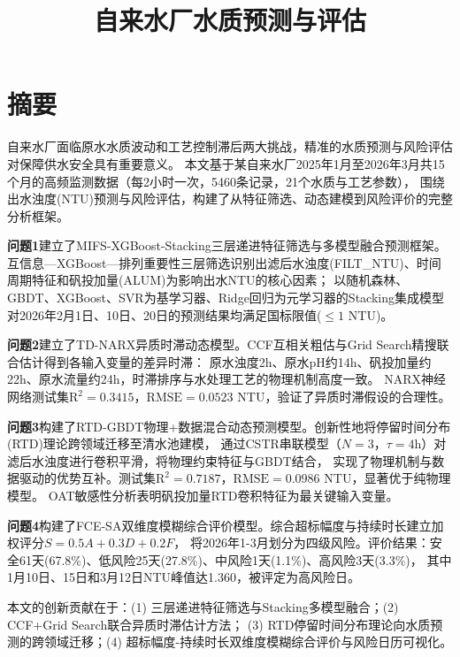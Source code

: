 \documentclass[12pt,a4paper]{ctexart}
\title{\vspace{-2cm}\textbf{自来水厂水质预测与评估}}
\author{}
\date{}
\begin{document}
\maketitle
\thispagestyle{empty}

\section*{摘\quad 要}
\thispagestyle{fancy}

自来水厂面临原水水质波动和工艺控制滞后两大挑战，精准的水质预测与风险评估对保障供水安全具有重要意义。
本文基于某自来水厂2025年1月至2026年3月共15个月的高频监测数据（每2小时一次，5460条记录，21个水质与工艺参数），
围绕出水浊度(NTU)预测与风险评估，构建了从特征筛选、动态建模到风险评价的完整分析框架。

\textbf{问题1}建立了MIFS-XGBoost-Stacking三层递进特征筛选与多模型融合预测框架。
互信息—XGBoost—排列重要性三层筛选识别出滤后水浊度(FILT\_NTU)、时间周期特征和矾投加量(ALUM)为影响出水NTU的核心因素；
以随机森林、GBDT、XGBoost、SVR为基学习器、Ridge回归为元学习器的Stacking集成模型对2026年2月1日、10日、20日的预测结果均满足国标限值($\leq 1$ NTU)。

\textbf{问题2}建立了TD-NARX异质时滞动态模型。CCF互相关粗估与Grid Search精搜联合估计得到各输入变量的差异时滞：
原水浊度2h、原水pH约14h、矾投加量约22h、原水流量约24h，时滞排序与水处理工艺的物理机制高度一致。
NARX神经网络测试集$\mathrm{R}^2=0.3415$，$\mathrm{RMSE}=0.0523$ NTU，验证了异质时滞假设的合理性。

\textbf{问题3}构建了RTD-GBDT物理+数据混合动态预测模型。创新性地将停留时间分布(RTD)理论跨领域迁移至清水池建模，
通过CSTR串联模型（$N=3$，$\tau=4$h）对滤后水浊度进行卷积平滑，将物理约束特征与GBDT结合，
实现了物理机制与数据驱动的优势互补。测试集$\mathrm{R}^2=0.7187$，$\mathrm{RMSE}=0.0986$ NTU，显著优于纯物理模型。
OAT敏感性分析表明矾投加量RTD卷积特征为最关键输入变量。

\textbf{问题4}构建了FCE-SA双维度模糊综合评价模型。综合超标幅度与持续时长建立加权评分$S=0.5A+0.3D+0.2F$，
将2026年1-3月划分为四级风险。评价结果：安全61天(67.8\%)、低风险25天(27.8\%)、中风险1天(1.1\%)、高风险3天(3.3\%)，
其中1月10日、15日和3月12日NTU峰值达1.360，被评定为高风险日。

本文的创新贡献在于：(1) 三层递进特征筛选与Stacking多模型融合；(2) CCF+Grid Search联合异质时滞估计方法；
(3) RTD停留时间分布理论向水质预测的跨领域迁移；(4) 超标幅度-持续时长双维度模糊综合评价与风险日历可视化。
\end{document}
